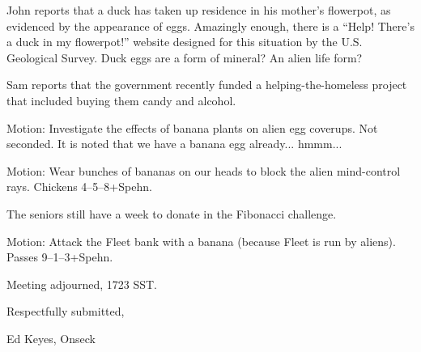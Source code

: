 \documentclass[12pt]{article}
\begin{document}
John reports that a duck has taken up residence in his mother's flowerpot,
as evidenced by the appearance of eggs.  Amazingly enough, there is a
``Help!  There's a duck in my flowerpot!'' website designed for this
situation by the U.S. Geological Survey.  Duck eggs are a form of mineral?
An alien life form?

Sam reports that the government recently funded a helping-the-homeless
project that included buying them candy and alcohol.

Motion: Investigate the effects of banana plants on alien egg coverups.
Not seconded.  It is noted that we have a banana egg already... hmmm...

Motion: Wear bunches of bananas on our heads to block the alien mind-control
rays.  Chickens 4--5--8+Spehn.

The seniors still have a week to donate in the Fibonacci challenge.

Motion: Attack the Fleet bank with a banana (because Fleet is run by
aliens).  Passes 9--1--3+Spehn.

\vspace{12pt}

\noindent
Meeting adjourned, 1723 SST.

\vspace{18pt}

\centerline{Respectfully submitted,}
\centerline{Ed Keyes, Onseck}
\end{document}
